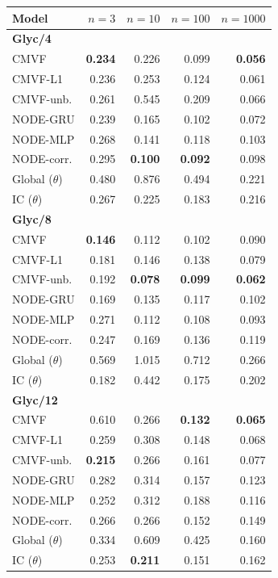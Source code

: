 \begin{tabular*}{\linewidth}{@{\extracolsep{\fill}}lrrrr}
\toprule
Model & $n=3$ & $n=10$ & $n=100$ & $n=1000$ \\
\midrule
\multicolumn{5}{l}{\textbf{Glyc/4}} \\
CMVF & \textbf{0.234} & 0.226 & 0.099 & \textbf{0.056} \\
CMVF-L1 & 0.236 & 0.253 & 0.124 & 0.061 \\
CMVF-unb. & 0.261 & 0.545 & 0.209 & 0.066 \\
NODE-GRU & 0.239 & 0.165 & 0.102 & 0.072 \\
NODE-MLP & 0.268 & 0.141 & 0.118 & 0.103 \\
NODE-corr. & 0.295 & \textbf{0.100} & \textbf{0.092} & 0.098 \\
Global ($\theta$) & 0.480 & 0.876 & 0.494 & 0.221 \\
IC ($\theta$) & 0.267 & 0.225 & 0.183 & 0.216 \\
\midrule
\multicolumn{5}{l}{\textbf{Glyc/8}} \\
CMVF & \textbf{0.146} & 0.112 & 0.102 & 0.090 \\
CMVF-L1 & 0.181 & 0.146 & 0.138 & 0.079 \\
CMVF-unb. & 0.192 & \textbf{0.078} & \textbf{0.099} & \textbf{0.062} \\
NODE-GRU & 0.169 & 0.135 & 0.117 & 0.102 \\
NODE-MLP & 0.271 & 0.112 & 0.108 & 0.093 \\
NODE-corr. & 0.247 & 0.169 & 0.136 & 0.119 \\
Global ($\theta$) & 0.569 & 1.015 & 0.712 & 0.266 \\
IC ($\theta$) & 0.182 & 0.442 & 0.175 & 0.202 \\
\midrule
\multicolumn{5}{l}{\textbf{Glyc/12}} \\
CMVF & 0.610 & 0.266 & \textbf{0.132} & \textbf{0.065} \\
CMVF-L1 & 0.259 & 0.308 & 0.148 & 0.068 \\
CMVF-unb. & \textbf{0.215} & 0.266 & 0.161 & 0.077 \\
NODE-GRU & 0.282 & 0.314 & 0.157 & 0.123 \\
NODE-MLP & 0.252 & 0.312 & 0.188 & 0.116 \\
NODE-corr. & 0.266 & 0.266 & 0.152 & 0.149 \\
Global ($\theta$) & 0.334 & 0.609 & 0.425 & 0.160 \\
IC ($\theta$) & 0.253 & \textbf{0.211} & 0.151 & 0.162 \\

\end{tabular*}
